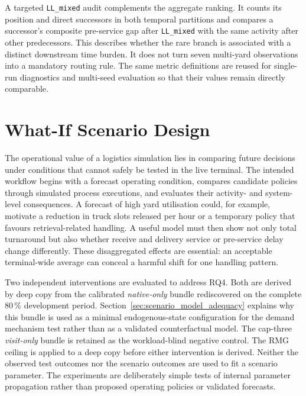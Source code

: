 A targeted \texttt{LL\_mixed} audit complements the aggregate ranking. It
counts its position and direct successors in both temporal partitions and
compares a successor's composite pre-service gap after \texttt{LL\_mixed} with
the same activity after other predecessors. This describes whether the rare
branch is associated with a distinct downstream time burden. It does not turn
seven multi-yard observations into a mandatory routing rule. The same metric
definitions are reused for single-run diagnostics and multi-seed evaluation so
that their values remain directly comparable.

\section{What-If Scenario Design}
\label{sec:what_if_design}

The operational value of a logistics simulation lies in comparing future
decisions under conditions that cannot safely be tested in the live terminal.
The intended workflow begins with a forecast operating condition, compares
candidate policies through simulated process executions, and evaluates their
activity- and system-level consequences. A forecast of high yard utilisation could, for
example, motivate a reduction in truck slots released per hour or a temporary
policy that favours retrieval-related handling. A useful model must then show
not only total turnaround but also whether receive and delivery service or
pre-service delay change differently. These disaggregated effects are essential:
an acceptable terminal-wide average can conceal a harmful shift for one
handling pattern.

Two independent interventions are evaluated to address RQ4. Both are derived
by deep copy from the calibrated \textit{native-only} bundle rediscovered on
the complete 80\,\% development period. Section~\ref{sec:scenario_model_adequacy}
explains why this bundle is used as a minimal endogenous-state configuration
for the demand mechanism test rather than as a validated counterfactual model.
The cap-three \textit{visit-only} bundle is retained as the workload-blind
negative control.
The RMG ceiling is applied to a deep copy before either intervention is
derived. Neither the observed test outcomes nor the scenario outcomes are used
to fit a scenario parameter. The experiments are deliberately simple tests of
internal parameter propagation rather than proposed operating policies or
validated forecasts.

